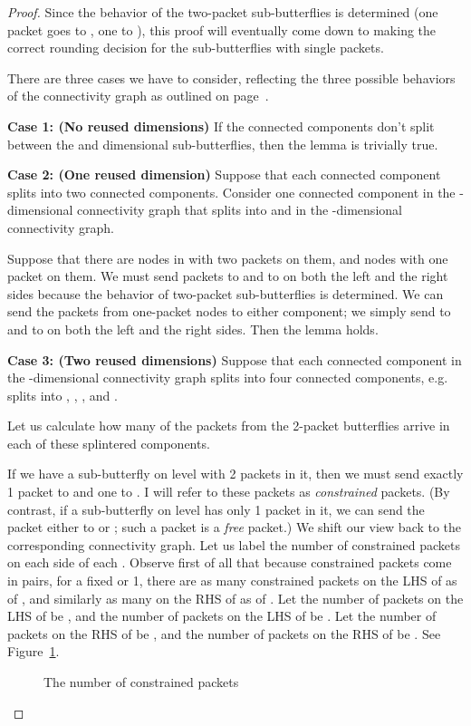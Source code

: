 \documentclass[12pt]{article}
\begin{document}
\begin{proof}
Since the behavior of the two-packet sub-butterflies is determined
(one packet goes to , one to ),
this proof will eventually come down to making the correct 
rounding decision for the sub-butterflies with single packets.

There are three cases we have to consider, reflecting the three
possible behaviors of the connectivity graph as outlined on 
page~\pageref{three cases}.

\textbf{Case 1:  (No reused dimensions)}  If the connected components don't
split between the  and  dimensional sub-butterflies,
then the lemma is trivially true.

\textbf{Case 2:  (One reused dimension)}  Suppose that each connected component
splits into two connected components.  Consider one connected component
 in the -dimensional connectivity graph that splits into 
 and  in the -dimensional connectivity graph.

Suppose that there are
 nodes in  with two packets on them, and  nodes with one 
packet on them.  We must send  packets to  and  to 
on both the left and the right sides
because the behavior of two-packet sub-butterflies is determined.
We can send the  packets from one-packet nodes to either component;
we simply send
 to  and  to 
on both the left and the right sides.  Then the lemma holds.

\textbf{Case 3:  (Two reused dimensions)} Suppose that each connected
component in the -dimensional connectivity graph splits into four
connected components, e.g.  splits into , , 
, and .  


Let us calculate how many
of the packets from the 2-packet butterflies arrive in each of these
splintered components.  

If we have a sub-butterfly  on level  with 2 packets in it, then 
we must send exactly 1 packet to  and one to 
.  I will refer to these packets as \emph{constrained} packets.  
(By contrast, if a sub-butterfly  on level  has only 1 packet in it,
we can send the packet either to  or ; such a packet is 
a \emph{free} packet.)  We shift our view back to the corresponding
connectivity graph.
Let us label the number of constrained packets on each side of each 
.
Observe first of all that because constrained packets come in pairs,
for a fixed  or 1, there are as many constrained
packets on the LHS of  as of , and similarly
as many on the RHS of  as of .  
Let the number of packets on the LHS of
 be , and the number of packets on the LHS of 
 be .
Let the number of packets on the RHS of 
 be , and the number of packets on the RHS of 
 be .
See Figure~\ref{constrained}. 
\begin{figure}[ht] 
\centerline{ \hspace{.2in}  } 
\caption{The number of constrained packets} 
\label{constrained}
\end{figure}


\end{proof}
\end{document}

